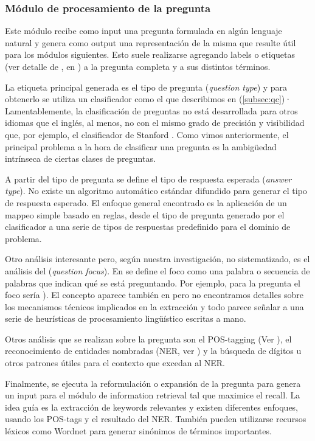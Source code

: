 \subsubsection*{Módulo de procesamiento de la pregunta}
Este módulo recibe como input una pregunta formulada en algún lenguaje natural y genera como output una representación de la misma que resulte útil para los módulos siguientes. Esto suele realizarse agregando labels o etiquetas (ver detalle de , en ) a la pregunta completa y a sus distintos términos.

La etiqueta principal generada es el tipo de pregunta (\textit{question type}) y para obtenerlo se utiliza un clasificador como el que describimos en (\ref{subsec:qc})· Lamentablemente, la clasificación de preguntas no está desarrollada para otros idiomas que el inglés, al menos, no con el mismo grado de precisión y visibilidad que, por ejemplo, el clasificador de Stanford \cite{QC1} \cite{QC2}. Como vimos anteriormente, el principal problema a la hora de clasificar una pregunta es la ambigüedad intrínseca de ciertas clases de preguntas. 

A partir del tipo de pregunta se define el tipo de respuesta esperada (\textit{answer type}). No existe un algoritmo automático estándar difundido para generar el tipo de respuesta esperado. El enfoque general encontrado es la aplicación de un mappeo simple basado en reglas, desde el tipo de pregunta generado por el clasificador a una serie de tipos de respuestas predefinido para el dominio de problema.

Otro análisis interesante pero, según nuestra investigación, no sistematizado, es el análisis del  (\textit{question focus}). En \cite{QA3} se define el foco como una palabra o secuencia de palabras que indican qué se está preguntando. Por ejemplo, para la pregunta  el foco sería ). El concepto aparece también en \cite{WATSON1} pero no encontramos detalles sobre los mecanismos técnicos implicados en la extracción y todo parece señalar a una serie de heurísticas de procesamiento lingüístico escritas a mano. 

Otros análisis que se realizan sobre la pregunta son el POS-tagging (Ver ), el reconocimiento de entidades nombradas (NER, ver ) y la búsqueda de dígitos u otros patrones útiles para el contexto que excedan al NER.

Finalmente, se ejecuta la reformulación o expansión de la pregunta para genera un input para el módulo de information retrieval tal que maximice el recall. 
La idea guía es la extracción de keywords relevantes y existen diferentes enfoques, usando los POS-tags y el resultado del NER. También pueden utilizarse recursos léxicos como Wordnet para generar sinónimos de términos importantes. 

